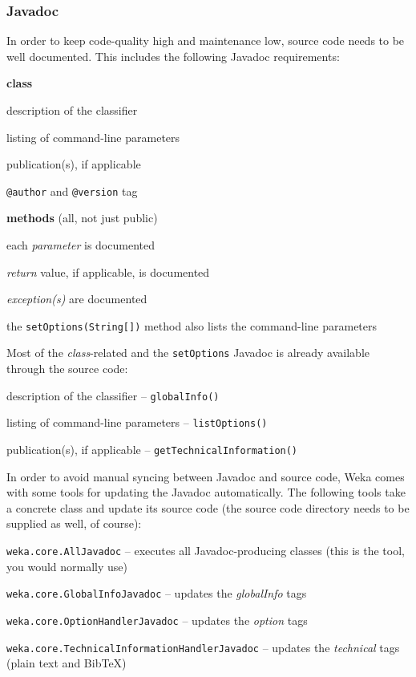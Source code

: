 \newpage
\subsubsection*{Javadoc}
\label{classifier_javadoc}
In order to keep code-quality high and maintenance low, source code needs to
be well documented. This includes the following Javadoc requirements:
\begin{tight_itemize}
  \item \textbf{class}
    \begin{tight_itemize}
      \item description of the classifier
      \item listing of command-line parameters
      \item publication(s), if applicable
      \item \texttt{@author} and \texttt{@version} tag
    \end{tight_itemize}

  \item \textbf{methods} (all, not just public)
    \begin{tight_itemize}
      \item each \textit{parameter} is documented
      \item \textit{return} value, if applicable, is documented
      \item \textit{exception(s)} are documented
      \item the \texttt{setOptions(String[])} method also lists the
command-line parameters
    \end{tight_itemize}
\end{tight_itemize}
Most of the \textit{class}-related and the \texttt{setOptions} Javadoc is
already available through the source code:
\begin{tight_itemize}
  \item description of the classifier -- \texttt{globalInfo()}
  \item listing of command-line parameters -- \texttt{listOptions()}
  \item publication(s), if applicable -- \texttt{getTechnicalInformation()}
\end{tight_itemize}
In order to avoid manual syncing between Javadoc and source code, Weka comes
with some tools for updating the Javadoc automatically. The following tools take
a concrete class and update its source code (the source code directory needs to
be supplied as well, of course):
\begin{tight_itemize}
  \item \texttt{weka.core.AllJavadoc} -- executes all Javadoc-producing
classes (this is the tool, you would normally use)
  \item \texttt{weka.core.GlobalInfoJavadoc} -- updates the \textit{globalInfo}
tags
  \item \texttt{weka.core.OptionHandlerJavadoc} -- updates the \textit{option}
tags
  \item \texttt{weka.core.TechnicalInformationHandlerJavadoc} -- updates the
\textit{technical} tags (plain text and BibTeX)
\end{tight_itemize}

